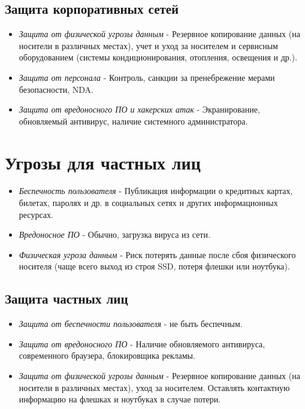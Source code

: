 \documentclass[14pt,a4paper,report]{report}
\begin{document}
\subsection{Защита корпоративных сетей}

\begin{itemize}
	\item \emph{Защита от физической угрозы данным} - Резервное копирование данных (на носители в различных местах), учет и уход за носителем и сервисным оборудованием (системы кондиционирования, отопления, освещения и др.).
	\item \emph{Защита от персонала} - Контроль, санкции за пренебрежение мерами безопасности, NDA.
	\item \emph{Защита от вредоносного ПО и хакерских атак} - Экранирование, обновляемый антивирус, наличие системного администратора.
\end{itemize}

\section{Угрозы для частных лиц}

\begin{itemize}
	\item \emph{Беспечность пользователя} - Публикация информации о кредитных картах, билетах, паролях и др. в социальных сетях и других информационных ресурсах.
	\item \emph{Вредоносное ПО} - Обычно, загрузка вируса из сети.
	\item \emph{Физическая угроза данным} - Риск потерять данные после сбоя физического носителя (чаще всего выход из строя SSD, потеря флешки или ноутбука).
\end{itemize}

\subsection{Защита частных лиц}

\begin{itemize}
	\item \emph{Защита от беспечности пользователя} - не быть беспечным.
	\item \emph{Защита от вредоносного ПО} - Наличие обновляемого антивируса, современного браузера, блокировщика рекламы.
	\item \emph{Защита от физической угрозы данным} - Резервное копирование данных (на носители в различных местах), уход за носителем. Оставлять контактную информацию на флешках и ноутбуках в случае потери.
\end{itemize}
\end{document}
